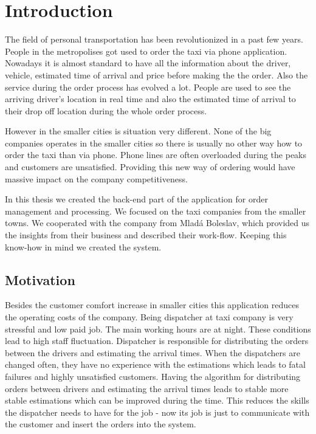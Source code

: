 \chapter{Introduction}

The field of personal transportation has been revolutionized in a past few years. People in the metropolises got used to order the taxi via phone application. Nowadays it is almost standard to have all the information about the driver, vehicle, estimated time of arrival and price before making the the order. Also the service during the order process has evolved a lot. People are used to see the arriving driver's location in real time and also the estimated time of arrival to their drop off location during the whole order process. 

However in the smaller cities is situation very different. None of the big companies operates in the smaller cities so there is usually no other way how to order the taxi than via phone. Phone lines are often overloaded during the peaks and customers are unsatisfied. Providing this new way of ordering would have massive impact on the company competitiveness.

In this thesis we created the back-end part of the application for order management and processing. We focused on the taxi companies from the smaller towns. We cooperated with the company from Mladá Boleslav, which provided us the insights from their business and described their work-flow. Keeping this know-how in mind we created the system.

\section{Motivation}

Besides the customer comfort increase in smaller cities this application reduces the operating costs of the company. Being dispatcher at taxi company is very stressful and low paid job. The main working hours are at night. These conditions lead to high staff fluctuation. Dispatcher is responsible for distributing the orders between the drivers and estimating the arrival times. When the dispatchers are changed often, they have no experience with the estimations which leads to fatal failures and highly unsatisfied customers. Having the algorithm for distributing orders between drivers and estimating the arrival times leads to stable more stable estimations which can be improved during the time. This reduces the skills the dispatcher needs to have for the job - now its job is just to communicate with the customer and insert the orders into the system.

